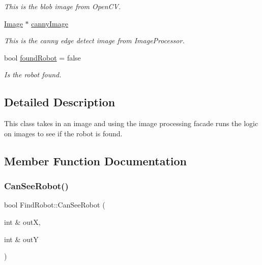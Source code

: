 \begin{DoxyCompactItemize}
\begin{DoxyCompactList}\small\item\em This is the blob image from Open\+CV. \end{DoxyCompactList}\item 
\mbox{\label{classFindRobot_ae5bfaf2d47f0db2af41661a3d844fa4a}} 
\hyperlink{classImage}{Image} $\ast$ \hyperlink{classFindRobot_ae5bfaf2d47f0db2af41661a3d844fa4a}{canny\+Image}
\begin{DoxyCompactList}\small\item\em This is the canny edge detect image from Image\+Processor. \end{DoxyCompactList}\item 
\mbox{\label{classFindRobot_aee4ed8c42df1924a51014976dcc6ac7a}} 
bool \hyperlink{classFindRobot_aee4ed8c42df1924a51014976dcc6ac7a}{found\+Robot} = false
\begin{DoxyCompactList}\small\item\em Is the robot found. \end{DoxyCompactList}\end{DoxyCompactItemize}


\subsection{Detailed Description}
This class takes in an image and using the image processing facade runs the logic on images to see if the robot is found. 

\subsection{Member Function Documentation}
\mbox{\label{classFindRobot_ae26378cc41e2e3c61e4833ec0e7b1d76}} 
\subsubsection{\texorpdfstring{Can\+See\+Robot()}{CanSeeRobot()}}
{\footnotesize\ttfamily bool Find\+Robot\+::\+Can\+See\+Robot (\begin{DoxyParamCaption}\item[{int \&}]{outX,  }\item[{int \&}]{outY }\end{DoxyParamCaption})\hspace{0.3cm}{\ttfamily [inline]}}



